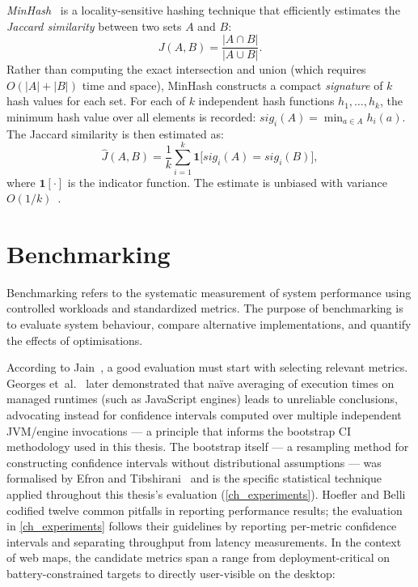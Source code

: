 \emph{MinHash}~\cite{broderResemblanceContainmentDocuments1998} is a locality-sensitive hashing technique that efficiently estimates the \emph{Jaccard similarity} between two sets $A$ and $B$:
\begin{equation}\label{eq:jaccard}
    J(A, B) = \frac{|A \cap B|}{|A \cup B|}.
\end{equation}
Rather than computing the exact intersection and union (which requires $O(|A| + |B|)$ time and space), MinHash constructs a compact \emph{signature} of $k$ hash values for each set.
For each of $k$ independent hash functions $h_1, \ldots, h_k$, the minimum hash value over all elements is recorded: $\mathit{sig}_i(A) = \min_{a \in A} h_i(a)$.
The Jaccard similarity is then estimated as:
\begin{equation}\label{eq:minhash}
    \hat{J}(A, B) = \frac{1}{k} \sum_{i=1}^{k} \mathbf{1}\bigl[\mathit{sig}_i(A) = \mathit{sig}_i(B)\bigr],
\end{equation}
where $\mathbf{1}[\cdot]$ is the indicator function.
The estimate is unbiased with variance $O(1/k)$~\cite{broderResemblanceContainmentDocuments1998}.


\section{Benchmarking}\label{sec_benchmarking}

Benchmarking refers to the systematic measurement of system performance using controlled workloads and standardized metrics.
The purpose of benchmarking is to evaluate system behaviour, compare alternative implementations, and quantify the effects of optimisations.

According to Jain~\cite{jainArtComputerSystems1991}, a good evaluation must start with selecting relevant metrics.
Georges et~al.~\cite{georgesStatisticallyRigorousJava2007} later demonstrated that na\"ive averaging of execution times on managed runtimes (such as JavaScript engines) leads to unreliable conclusions, advocating instead for confidence intervals computed over multiple independent JVM/engine invocations --- a principle that informs the bootstrap CI methodology used in this thesis.
The bootstrap itself --- a resampling method for constructing confidence intervals without distributional assumptions --- was formalised by Efron and Tibshirani~\cite{efronIntroductionBootstrap1993} and is the specific statistical technique applied throughout this thesis's evaluation (\cref{ch_experiments}).
Hoefler and Belli~\cite{hoeflerScientificBenchmarkingParallel2015} codified twelve common pitfalls in reporting performance results; the evaluation in \cref{ch_experiments} follows their guidelines by reporting per-metric confidence intervals and separating throughput from latency measurements.
In the context of web maps, the candidate metrics span a range from deployment-critical on battery-constrained targets to directly user-visible on the desktop:

